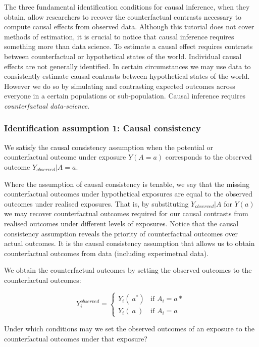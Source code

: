 \documentclass[
  singlecolumn]{report}
\begin{document}
The three fundamental identification conditions for causal inference,
when they obtain, allow researchers to recover the counterfactual
contrasts necessary to compute causal effects from observed data.
Although this tutorial does not cover methods of estimation, it is
crucial to notice that causal inference requires something more than
data science. To estimate a causal effect requires contrasts between
counterfactual or hypothetical states of the world. Individual causal
effects are not generally identified. In certain circumstances we may
use data to consistently estimate causal contrasts between hypothetical
states of the world. However we do so by simulating and contrasting
expected outcomes across everyone in a certain populations or
sub-population. Causal inference requires \emph{counterfactual
data-science}.

\hypertarget{identification-assumption-1-causal-consistency}{%
\subsubsection{Identification assumption 1: Causal
consistency}\label{identification-assumption-1-causal-consistency}}

We satisfy the causal consistency assumption when the potential or
counterfactual outcome under exposure \(Y(A=a)\) corresponds to the
observed outcome \(Y_{observed}|A=a\).

Where the assumption of causal consistency is tenable, we say that the
missing counterfactual outcomes under hypothetical exposures are equal
to the observed outcomes under realised exposures. That is, by
substituting \(Y_{observed}|A\) for \(Y(a)\) we may recover
counterfactual outcomes required for our causal contrasts from realised
outcomes under different levels of exposures. Notice that the causal
consistency assumption reveals the priority of counterfactual outcomes
over actual outcomes. It is the causal consistency assumption that
allows us to obtain counterfactual outcomes from data (including
experimetnal data).

We obtain the counterfactual outcomes by setting the observed outcomes
to the counterfactual outcomes:

\[
Y^{observed}_i = 
\begin{cases} 
Y_i(~a^*) & \text{if } A_i = a* \\
Y_i(~a~) & \text{if } A_i = a
\end{cases}
\]

Under which conditions may we set the observed outcomes of an exposure
to the counterfactual outcomes under that exposure?
\end{document}
